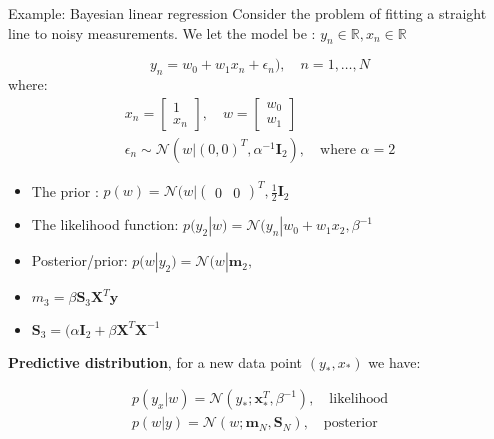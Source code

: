 \begin{example}{Example: Bayesian linear regression}
Consider the problem of fitting a straight line to noisy measurements. We let the model be : $y_n \in \mathbb{R}, x_n \in \mathbb{R}$ 

\begin{equation}
	y_n = w_0 + w_1 x_n + \epsilon_n), \quad n=1, \ldots, N
\end{equation}
where:
\begin{equation}
\begin{aligned}
	x_n = \begin{bmatrix} 1 \\ x_n \end{bmatrix}, \quad w = \begin{bmatrix} w_0 \\ w_1 \end{bmatrix} \\
	\epsilon _n \sim \mathcal{N}(w | (0,0) ^{T}, \alpha ^{-1} \bm{I}_2), \quad \text{where } \alpha = 2
\end{aligned}
\end{equation}

\begin{itemize}
	\item The prior : $p(w) = \mathcal{N}(w|\begin{pmatrix} 0& 0 \end{pmatrix} ^{T}, \frac{1} {2} \bm{I}_2$ 
	\item The likelihood function: $p(y_2|w) = \mathcal{N}(y_n|w_0+w_1x_2, \beta ^{-1}$
	\item Posterior/prior: $p(w|y_2) = \mathcal{N}(w|\bm{m}_2,$  
 	\item $m_3 = \beta  \bm{S}_3\bm{X}^{T}\bm{y}$
	\item $\bm{S}_3 = (\alpha \bm{I}_2 + \beta \bm{X}^{T}\bm{X}^{-1}$ 

\end{itemize}

\textbf{Predictive distribution}, for a new data point $(y_*, x_*)$  we have:

\begin{equation}
\begin{aligned}
 	p(y_x|w)= \mathcal{N}(y_*; \bm{x}_* ^{T}, \beta ^{-1}), \quad \text{likelihood} \\
	p(w|y) = \mathcal{N}(w;\bm{m}_N, \bm{S}_N), \quad \text{posterior}
\end{aligned}
\end{equation}


\end{example}

